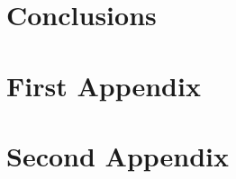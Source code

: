 \documentclass[]{nrel}
\begin{document}
\chapter{Conclusions}
\label{sec:conc}

\cleardoublepage
\label{sec:Bib}
\nocite{*} %
\printbibliography[heading=bibintoc, title={References}]


\appendix  %
\renewcommand\thechapter{Appendix \Alph{chapter}} %

\chapter{First Appendix}
\label{app:A}

\chapter{Second Appendix}
\label{app:B}
\end{document}
